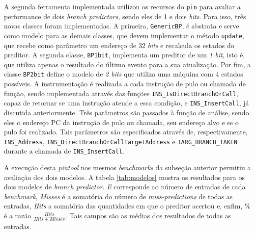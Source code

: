 \documentclass[12pt]{article}
\begin{document}
A segunda ferramenta implementada utilizou os recursos do \texttt{pin} para
avaliar a performance de dois \textit{branch predictors}, sendo eles de 1 e dois
\textit{bits}. Para isso, três novas classes foram implementadas. A primeira,
\texttt{GenericBP}, é abstrata e serve como modelo para as demais classes, que
devem implementar o método \texttt{update}, que recebe como parâmetro um
endereço de 32 \textit{bits} e recalcula os estados do preditor. A segunda
classe, \texttt{BP1bit}, implementa um preditor de um \textit{1 bit}, isto é,
que utiliza apenas o resultado do último evento para a sua atualização. Por fim,
a classe \texttt{BP2bit} define o modelo de \textit{2 bits} que utiliza uma
máquina com 4 estados possíveis. A instrumentação é realizada a cada instrução
de pulo ou chamada de função, sendo implementada através das funções
\texttt{INS\_IsDirectBranchOrCall}, capaz de retornar se uma instrução atende a
essa condição, e \texttt{INS\_InsertCall}, já discutida anteriormente. Três
parâmetros são passados à função de análise, sendo eles o endereço PC da
instrução de pulo ou chamada, seu endereço alvo e se o pulo foi realizado. Tais
parâmetros são especificados através de, respectivamente,
\texttt{INS\_Address}, \texttt{INS\_DirectBranchOrCallTargetAddress} e
\texttt{IARG\_BRANCH\_TAKEN} durante a chamada de \texttt{INS\_InsertCall}.

A execução desta \textit{pintool} nos mesmos \textit{benchmarks} da subseção
anterior permitiu a avaliação dos dois modelos.  A tabela
\ref{tab:modelos} mostra os resultados para os dois modelos de \textit{branch
predictor}. \textit{E} corresponde ao número de entradas de cada
\textit{benchmark}, \textit{Misses} é a somatória do número de
\textit{miss-predictions} de todas as entradas, \textit{Hits} a somatória das
quantidades em que o preditor acertou e, enfim, \% é a razão 
\(\frac{Hits}{Hits+Misses}\). Tais campos são as médias dos resultados de todas
as entradas.
\end{document}
